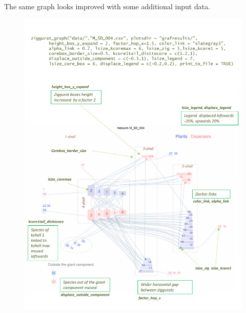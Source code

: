 \documentclass[12pt]{article}
\begin{document}
The same graph looks improved with some additional input data.
\clearpage
\begin{figure}[hbt!]
\centering
\includegraphics[scale=0.75]{M_SD_004_ziggurat_improved.pdf}
\label{fig:KMAN_ziggurat}
\end{figure}
\end{document}
